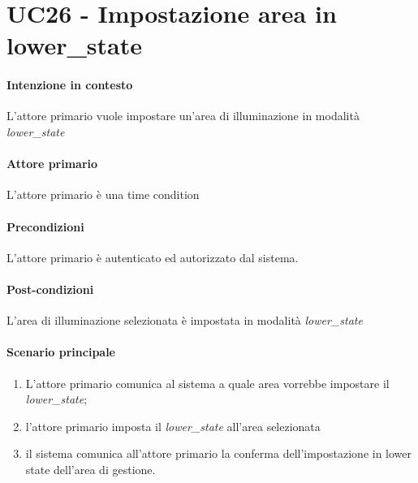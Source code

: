\section{UC26 - Impostazione area in lower\_state}\label{uc:26}
\paragraph{Intenzione in contesto} L'attore primario vuole impostare un'area di illuminazione in modalità \textit{lower\_state}
\paragraph{Attore primario} L'attore primario è una time condition %
\paragraph{Precondizioni} L'attore primario è autenticato ed autorizzato dal sistema.
\paragraph{Post-condizioni} L'area di illuminazione selezionata è impostata in modalità \textit{lower\_state}
\paragraph{Scenario principale}
\begin{enumerate}
    \item L'attore primario comunica al sistema a quale area vorrebbe impostare il \textit{lower\_state};
    \item l'attore primario imposta il \textit{lower\_state} all'area selezionata
    \item il sistema comunica all'attore primario la conferma dell'impostazione in lower state dell'area di gestione.
\end{enumerate}